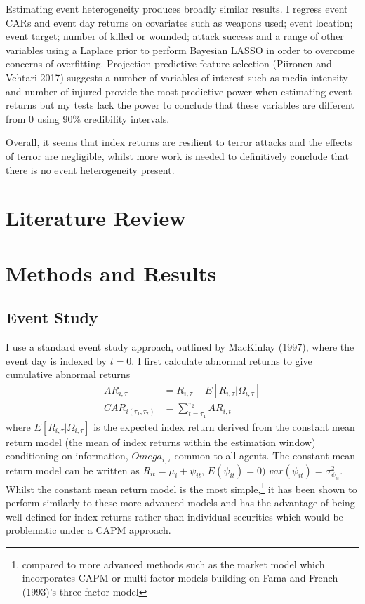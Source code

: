 \documentclass[]{AEA}
\begin{document}
Estimating event heterogeneity produces broadly similar results. I
regress event CARs and event day returns on covariates such as weapons
used; event location; event target; number of killed or wounded; attack
success and a range of other variables using a Laplace prior to perform
Bayesian LASSO in order to overcome concerns of overfitting. Projection
predictive feature selection (Piironen and Vehtari 2017) suggests a
number of variables of interest such as media intensity and number of
injured provide the most predictive power when estimating event returns
but my tests lack the power to conclude that these variables are
different from 0 using 90\% credibility intervals.

Overall, it seems that index returns are resilient to terror attacks and
the effects of terror are negligible, whilst more work is needed to
definitively conclude that there is no event heterogeneity present.

\section{Literature Review}

\section{Methods and Results}\subsection{Event Study}

I use a standard event study approach, outlined by MacKinlay (1997),
where the event day is indexed by \(t = 0\). I first calculate abnormal
returns to give cumulative abnormal returns
\[ \begin{aligned} AR_{i,\tau} &=R_{i,\tau}-E[R_{i,\tau}\vert\Omega_{i,\tau}] \\
CAR_{i(\tau_{1},\tau_{2})} &=\sum_{t=\tau_{1}}^{\tau_{2}} AR_{i,t} \end{aligned}\]
where \(E[R_{i,\tau}\vert\Omega_{i,\tau}]\) is the expected index return
derived from the constant mean return model (the mean of index returns
within the estimation window) conditioning on information,
\(Omega_{i,\tau}\) common to all agents. The constant mean return model
can be written as \(R_{it} = \mu_i + \psi_{it}\), \(E(\psi_{it}) = 0)\)
\(var(\psi_{it}) = \sigma_{\psi_{it}}^2\). Whilst the constant mean
return model is the most simple,\footnote{compared to more advanced
  methods such as the market model which incorporates CAPM or
  multi-factor models building on Fama and French (1993)'s three factor
  model} it has been shown to perform similarly to these more advanced
models and has the advantage of being well defined for index returns
rather than individual securities which would be problematic under a
CAPM approach.
\end{document}
